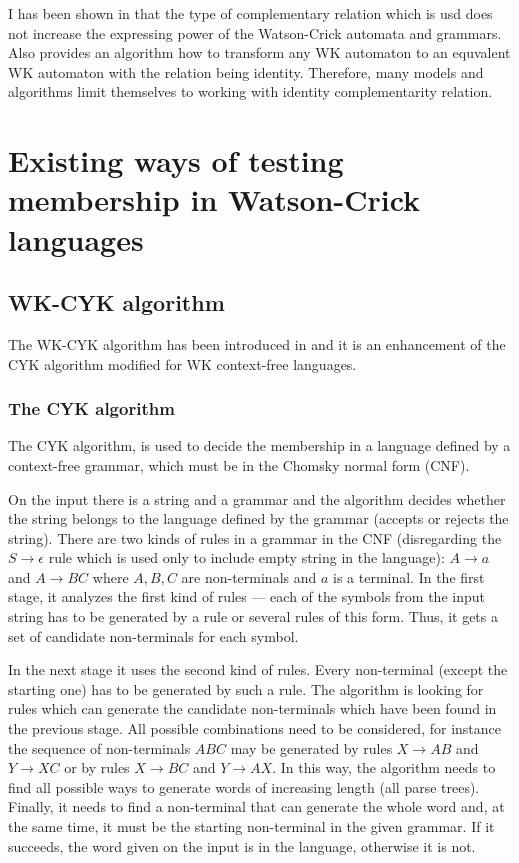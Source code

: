 I has been shown in \cite{COMPL_REL} that the type of complementary relation which is usd does not increase the expressing power of the Watson-Crick automata and grammars. Also \cite{SURVEY} provides an algorithm how to transform any WK automaton to an equvalent WK automaton with the relation being identity. Therefore, many models and algorithms limit themselves to working with identity complementarity relation.


\chapter{Existing ways of testing membership in Watson-Crick languages} \label{chapter:WK_CYK}

\section{WK-CYK algorithm}
The WK-CYK algorithm has been introduced in \cite{WK_CYK} and it is an enhancement of the CYK algorithm modified for WK context-free languages.

\subsection{The CYK algorithm}
The CYK algorithm, is used to decide the membership in a language defined by a context-free grammar, which must be in the Chomsky normal form (CNF).

On the input there is a string and a grammar and the algorithm decides whether the string belongs to the language defined by the grammar (accepts or rejects the string). There are two kinds of rules in a grammar in the CNF (disregarding the $S \rightarrow \epsilon$ rule which is used only to include empty string in the language): $A \rightarrow a$ and $A \rightarrow BC$ where $A, B, C$ are non-terminals and $a$ is a terminal. In the first stage, it analyzes the first kind of rules --- each of the symbols from the input string has to be generated by a rule or several rules of this form. Thus, it gets a set of candidate non-terminals for each symbol.

In the next stage it uses the second kind of rules. Every non-terminal (except the starting one) has to be generated by such a rule.
The algorithm is looking for rules which can generate the candidate non-terminals which have been found in the previous stage. All possible combinations need to be considered, for instance the sequence of non-terminals $ABC$ may be generated by rules $X \rightarrow AB$ and $Y \rightarrow XC$ or by rules $X \rightarrow BC$ and $Y \rightarrow AX$. In this way, the algorithm needs to find all possible ways to generate words of increasing length (all parse trees). Finally, it needs to find a non-terminal that can generate the whole word and, at the same time, it must be the starting non-terminal in the given grammar. If it succeeds, the word given on the input is in the language, otherwise it is not.

